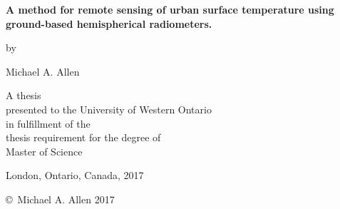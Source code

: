 \pagestyle{empty}

\begin{titlepage}
        \begin{center}
        \vspace*{1.0cm}

        \Huge
        {\bf A method for remote sensing of urban surface temperature using ground-based hemispherical radiometers.}

        \vspace*{1.0cm}

        \normalsize
        by \\

        \vspace*{1.0cm}

        \Large
        Michael A. Allen \\
        
        \vspace*{3.0cm}

        \normalsize
        A thesis \\
        presented to the University of Western Ontario\\ 
        in fulfillment of the \\
        thesis requirement for the degree of \\
        Master of Science \\

        \vspace*{2.0cm}

        London, Ontario, Canada, 2017 \\

        \vspace*{1.0cm}

        \copyright\ Michael A. Allen 2017 \\
        \end{center}
\end{titlepage}

